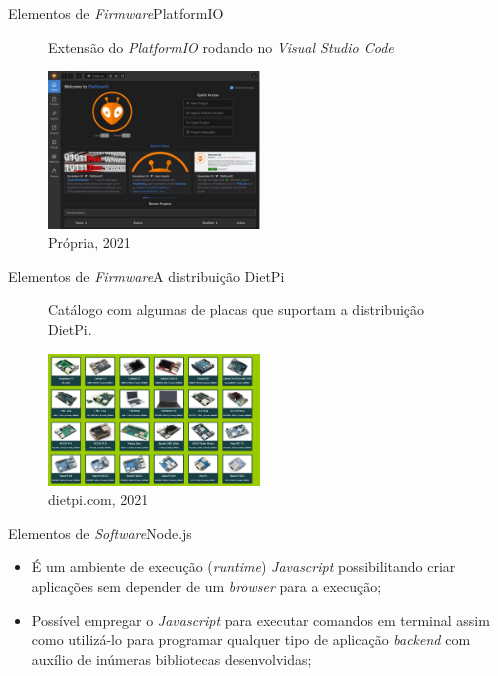 \begin{frame}{Elementos de \textit{Firmware}}{PlatformIO}


\begin{figure}[H]
	\centering
	\caption{Extensão do \textit{PlatformIO} rodando no \textit{Visual Studio Code}}
	\includegraphics[width=0.5\textwidth]{figuras/platformio.jpg}
	\caption*{\tiny{Própria, 2021}}
	\label{fig:platformio}
\end{figure}
\end{frame}

\begin{frame}{Elementos de \textit{Firmware}}{A distribuição DietPi}
    \begin{figure}[H]
        \centering
        \caption{Catálogo com algumas de placas que suportam a distribuição DietPi.}
        \includegraphics[width=0.5\textwidth]{figuras/dietpi.jpg}
        \caption*{\tiny{dietpi.com, 2021}}
        \label{fig:dietpi}
    \end{figure} 
\end{frame}

\begin{frame}{Elementos de \textit{Software}}{Node.js}

    \begin{itemize}
        \item É um ambiente de execução (\textit{runtime}) \textit{Javascript} possibilitando criar aplicações sem depender de um \textit{browser} para a execução;
        \item Possível empregar o \textit{Javascript} para executar comandos em terminal assim como utilizá-lo para programar qualquer tipo de aplicação \textit{backend} com auxílio de inúmeras bibliotecas desenvolvidas;
    \end{itemize}

\end{frame}



